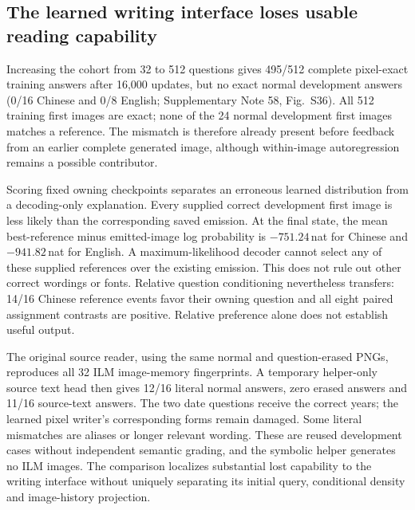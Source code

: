 \subsection*{The learned writing interface loses usable reading capability}
Increasing the cohort from 32 to 512 questions gives 495/512 complete
pixel-exact training answers after 16,000 updates, but no exact normal
development answers (0/16 Chinese and 0/8 English; Supplementary Note 58,
Fig.~S36). All 512 training first images are exact; none of the 24 normal
development first images matches a reference. The mismatch is therefore
already present before feedback from an earlier complete generated image,
although within-image autoregression remains a possible contributor.

Scoring fixed owning checkpoints separates an erroneous learned distribution
from a decoding-only explanation. Every supplied correct development first
image is less likely than the corresponding saved emission. At the final
state, the mean best-reference minus emitted-image log probability is
$-751.24$\,nat for Chinese and $-941.82$\,nat for English. A maximum-likelihood
decoder cannot select any of these supplied references over the existing
emission. This does not rule out other correct wordings or fonts. Relative
question conditioning nevertheless transfers: 14/16 Chinese reference events
favor their owning question and all eight paired assignment contrasts are
positive. Relative preference alone does not establish useful output.

The original source reader, using the same normal and question-erased PNGs,
reproduces all 32 ILM image-memory fingerprints. A temporary helper-only
source text head then gives 12/16 literal normal answers, zero erased answers
and 11/16 source-text answers. The two date questions receive the correct
years; the learned pixel writer's corresponding forms remain damaged.
Some literal mismatches are aliases or longer relevant wording. These are
reused development cases without independent semantic grading, and the
symbolic helper generates no ILM images. The comparison localizes substantial
lost capability to the writing interface without uniquely separating its
initial query, conditional density and image-history projection.

